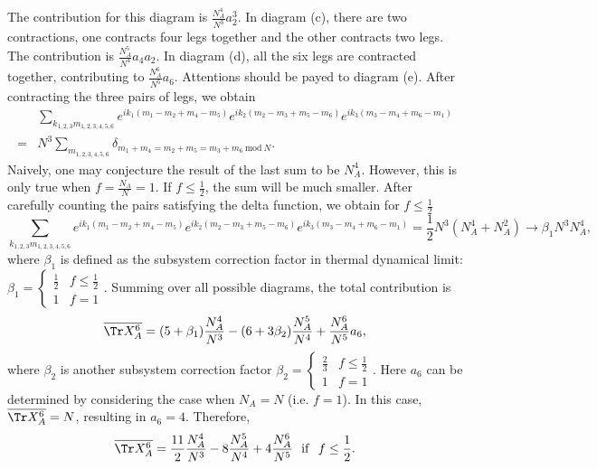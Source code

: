 The contribution for this diagram is $\frac{N_{A}^{4}}{N^{3}}a_{2}^{3}$.
In diagram (c), there are two contractions, one contracts four legs
together and the other contracts two legs. The contribution is $\frac{N_{A}^{5}}{N^{4}}a_{4}a_{2}$.
In diagram (d), all the six legs are contracted together, contributing
to $\frac{N_{A}^{6}}{N^{5}}a_{6}$. Attentions should be payed to %
diagram (e). After contracting the three pairs of legs, we obtain
\begin{equation}
\begin{split} & \sum_{k_{1,2,3}m_{1,2,3,4,5,6}}e^{ik_{1}(m_{1}-m_{2}+m_{4}-m_{5})}e^{ik_{2}(m_{2}-m_{3}+m_{5}-m_{6})}e^{ik_{3}(m_{3}-m_{4}+m_{6}-m_{1})}\\
= & N^{3}\sum_{m_{1,2,3,4,5,6}}\delta_{m_{1}+m_{4}=m_{2}+m_{5}=m_{3}+m_{6}\ \mathrm{mod\ }N}.
\end{split}
\end{equation}
Naively, one may conjecture %
the result of the last sum to %
be $N_{A}^{4}$.
However, this is only true when $f=\frac{N_{A}}{N}=1$. If $f\leq\frac{1}{2}$,
the sum will be much smaller. After carefully counting the pairs satisfying
the delta function, we obtain for $f\leq\frac{1}{2}$
\begin{equation}
\sum_{k_{1,2,3}m_{1,2,3,4,5,6}}e^{ik_{1}(m_{1}-m_{2}+m_{4}-m_{5})}e^{ik_{2}(m_{2}-m_{3}+m_{5}-m_{6})}e^{ik_{3}(m_{3}-m_{4}+m_{6}-m_{1})}=\frac{1}{2}N^{3}(N_{A}^{4}+N_{A}^{2})\to\beta_{1}N^{3}N_{A}^{4},
\end{equation}
where $\beta_{1}$ is defined as the subsystem correction factor in
thermal dynamical limit: $\beta_{1}=\begin{cases}
\frac{1}{2} & f\leq\frac{1}{2}\\
1 & f=1
\end{cases}$. Summing over all possible diagrams, the total contribution is 
\begin{equation}
\overline{\Tr X_{A}^{6}}=(5+\beta_{1})\frac{N_{A}^{4}}{N^{3}}-(6+3\beta_{2})\frac{N_{A}^{5}}{N^{4}}+\frac{N_{A}^{6}}{N^{5}}a_{6},
\end{equation}
where $\beta_{2}$ is another subsystem correction factor $\beta_{2}=\begin{cases}
\frac{2}{3} & f\leq\frac{1}{2}\\
1 & f=1
\end{cases}$. Here $a_{6}$ can be determined by considering the case when $N_{A}=N$
(i.e. $f=1$). In this case, $\overline{\Tr X_{A}^{6}}=N$, resulting
in $a_{6}=4$. Therefore, 
\begin{equation}
\overline{\Tr X_{A}^{6}}=\frac{11}{2}\frac{N_{A}^{4}}{N^{3}}-8\frac{N_{A}^{5}}{N^{4}}+4\frac{N_{A}^{6}}{N^{5}}\ \ \mathrm{if}\ \ f\leq\frac{1}{2}.
\end{equation}


